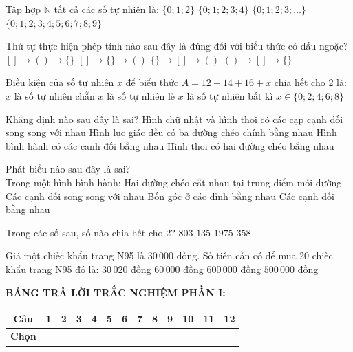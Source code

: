 \documentclass[12pt,a4paper]{article}
\begin{document}
\begin{ex}
Tập hợp $\mathbb{N}$ tất cả các số tự nhiên là:
\choice
{$\{0; 1; 2\}$}
{$\{0; 1; 2; 3; 4\}$}
{\True $\{0; 1; 2; 3; \dots\}$}
{$\{0; 1; 2; 3; 4; 5; 6; 7; 8; 9\}$}
\end{ex}

\begin{ex}
Thứ tự thực hiện phép tính nào sau đây là đúng đối với biểu thức có dấu ngoặc?
\choice
{$[] \to () \to \{\}$}
{$[] \to \{\} \to ()$}
{$\{\} \to [] \to ()$}
{\True $() \to [] \to \{\}$}
\end{ex}

\begin{ex}
Điều kiện của số tự nhiên $x$ để biểu thức $A = 12 + 14 + 16 + x$ chia hết cho 2 là:
\choice
{\True $x$ là số tự nhiên chẵn}
{$x$ là số tự nhiên lẻ}
{$x$ là số tự nhiên bất kì}
{$x \in \{0; 2; 4; 6; 8\}$}
\end{ex}

\begin{ex}
Khẳng định nào sau đây là sai?
\choice
{Hình chữ nhật và hình thoi có các cặp cạnh đối song song với nhau}
{Hình lục giác đều có ba đường chéo chính bằng nhau}
{Hình bình hành có các cạnh đối bằng nhau}
{\True Hình thoi có hai đường chéo bằng nhau}
\end{ex}

\begin{ex}
Phát biểu nào sau đây là sai?\\Trong một hình bình hành:
\choice
{Hai đường chéo cắt nhau tại trung điểm mỗi đường}
{Các cạnh đối song song với nhau}
{\True Bốn góc ở các đỉnh bằng nhau}
{Các cạnh đối bằng nhau}
\end{ex}

\begin{ex}
Trong các số sau, số nào chia hết cho 2?
\choice
{$803$}
{$135$}
{$1975$}
{\True $358$}
\end{ex}

\begin{ex}
Giá một chiếc khẩu trang N95 là $30\,000$ đồng. Số tiền cần có để mua 20 chiếc khẩu trang N95 đó là:
\choice
{$30\,020$ đồng}
{$60\,000$ đồng}
{\True $600\,000$ đồng}
{$500\,000$ đồng}
\end{ex}


\vspace{1mm}
\noindent\textbf{BẢNG TRẢ LỜI TRẮC NGHIỆM PHẦN I:}
\begin{center}
\begin{tabular}{|c|c|c|c|c|c|c|c|c|c|c|c|c|}
\hline
\textbf{Câu} & \textbf{1} & \textbf{2} & \textbf{3} & \textbf{4} & \textbf{5} & \textbf{6} & \textbf{7} & \textbf{8} & \textbf{9} & \textbf{10} & \textbf{11} & \textbf{12} \\
\hline
\textbf{Chọn} & \rule{0pt}{0.65cm} & & & & & & & & & & & \\
\hline
\end{tabular}
\end{center}
\vspace{2mm}
\end{document}
